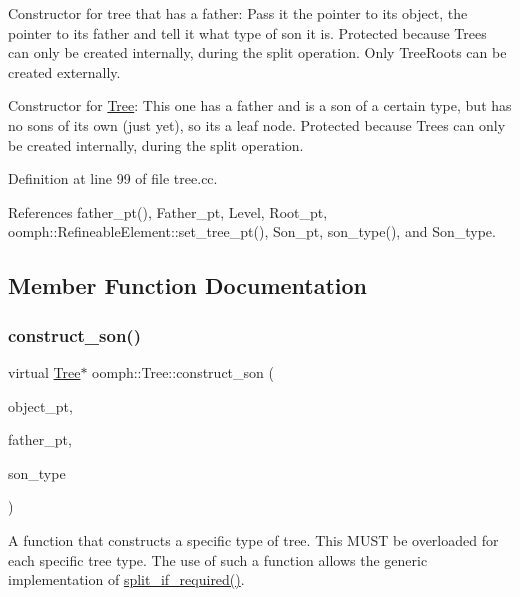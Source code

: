 Constructor for tree that has a father\+: Pass it the pointer to its object, the pointer to its father and tell it what type of son it is. Protected because Trees can only be created internally, during the split operation. Only Tree\+Roots can be created externally. 

Constructor for \hyperlink{classoomph_1_1Tree}{Tree}\+: This one has a father and is a son of a certain type, but has no sons of its own (just yet), so it\textquotesingle{}s a leaf node. Protected because Trees can only be created internally, during the split operation. 

Definition at line 99 of file tree.\+cc.



References father\+\_\+pt(), Father\+\_\+pt, Level, Root\+\_\+pt, oomph\+::\+Refineable\+Element\+::set\+\_\+tree\+\_\+pt(), Son\+\_\+pt, son\+\_\+type(), and Son\+\_\+type.



\subsection{Member Function Documentation}
\mbox{\label{classoomph_1_1Tree_a5eb29718044b1bc56403ee9bd15a60b6}} 
\subsubsection{\texorpdfstring{construct\+\_\+son()}{construct\_son()}}
{\footnotesize\ttfamily virtual \hyperlink{classoomph_1_1Tree}{Tree}$\ast$ oomph\+::\+Tree\+::construct\+\_\+son (\begin{DoxyParamCaption}\item[{\hyperlink{classoomph_1_1RefineableElement}{Refineable\+Element} $\ast$const \&}]{object\+\_\+pt,  }\item[{\hyperlink{classoomph_1_1Tree}{Tree} $\ast$const \&}]{father\+\_\+pt,  }\item[{const int \&}]{son\+\_\+type }\end{DoxyParamCaption})\hspace{0.3cm}{\ttfamily [pure virtual]}}



A function that constructs a specific type of tree. This M\+U\+ST be overloaded for each specific tree type. The use of such a function allows the generic implementation of \hyperlink{classoomph_1_1Tree_a975ccfd63ffa14a04f14a37b3d2ff931}{split\+\_\+if\+\_\+required()}. 



